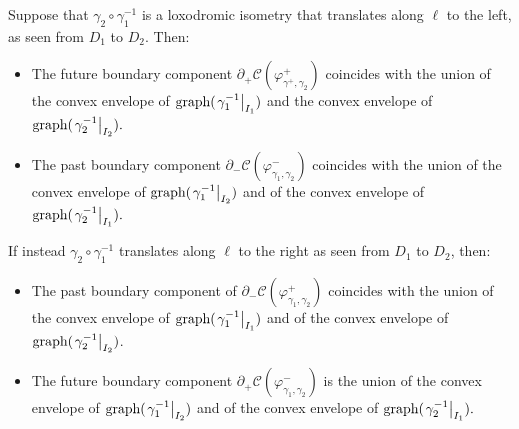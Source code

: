 
    
 \begin{proposition}\label{gettinthere}
    Suppose that $\gamma_2\circ\gamma_1^{-1}$ is a loxodromic isometry that translates along $\ell$ to the left, as seen from $D_1$ to $D_2$. Then:
     \begin{itemize}
         \item The future boundary component $\partial_+\mathcal{C}(\varphi_{\gamma^+,\gamma_2}^{+})$ coincides with the union of the convex envelope of $\text{graph}(\left.\gamma_1^{-1}\right|_{I_1})$ and the convex envelope of $\text{graph}(\left.\gamma_2^{-1}\right|_{I_2}).$
         \item The past boundary component $\partial_-\mathcal{C}(\varphi^-_{\gamma_1,\gamma_2})$ coincides with the union of the convex envelope of $\text{graph}(\left.\gamma_1^{-1}\right|_{I_2})$ and of the convex envelope of $\text{graph}(\left.\gamma_2^{-1}\right|_{I_1}).$
    \end{itemize}
    If instead $\gamma_2\circ\gamma_1^{-1}$ translates along $\ell$ to the right as seen from $D_1$ to $D_2$, then:
    \begin{itemize}
         \item The past boundary component of $\partial_-\mathcal{C}(\varphi_{\gamma_1,\gamma_2}^+)$ coincides with the union of the convex envelope of $\text{graph}(\left.\gamma_1^{-1}\right|_{I_1})$ and of the convex envelope of $\text{graph}(\left.\gamma_2^{-1}\right|_{I_2})$. 
         \item The future boundary component $\partial_+\mathcal{C}(\varphi_{\gamma_1,\gamma_2}^-)$ is the union of the convex envelope of $\text{graph}(\left.\gamma_1^{-1}\right|_{I_2})$ and of the convex envelope of $\text{graph}(\left.\gamma_2^{-1}\right|_{I_1}).$
     \end{itemize}
 \end{proposition}

